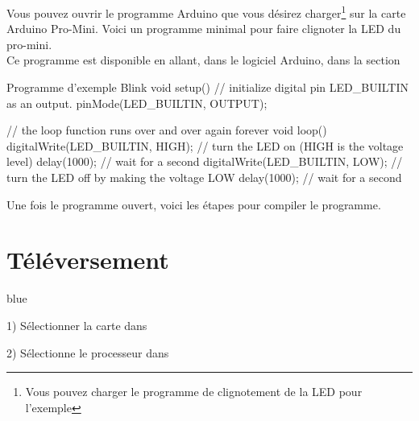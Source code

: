 
 




  Vous pouvez ouvrir le programme Arduino que vous désirez charger\footnote{Vous pouvez charger le programme de clignotement de la LED pour l'exemple} sur la carte Arduino Pro-Mini.
  Voici un programme minimal pour faire clignoter la LED du pro-mini. \\
  Ce programme est disponible en allant, dans le logiciel Arduino, dans la section \\
  
  \begin{Cpp}{Programme d'exemple Blink}
  void setup() {
  // initialize digital pin LED_BUILTIN as an output.
  pinMode(LED_BUILTIN, OUTPUT);
}

// the loop function runs over and over again forever
void loop() {
  digitalWrite(LED_BUILTIN, HIGH);   // turn the LED on (HIGH is the voltage level)
  delay(1000);                       // wait for a second
  digitalWrite(LED_BUILTIN, LOW);    // turn the LED off by making the voltage LOW
  delay(1000);                       // wait for a second
}
  \end{Cpp}
  
Une fois le programme ouvert, voici les étapes pour compiler le programme.

  \section{Téléversement}

  \begin{items}{blue}{\Triangle}
    \item 1) Sélectionner la carte  dans 

    \item 2) Sélectionne le processeur  dans 
  \end{items}

 
